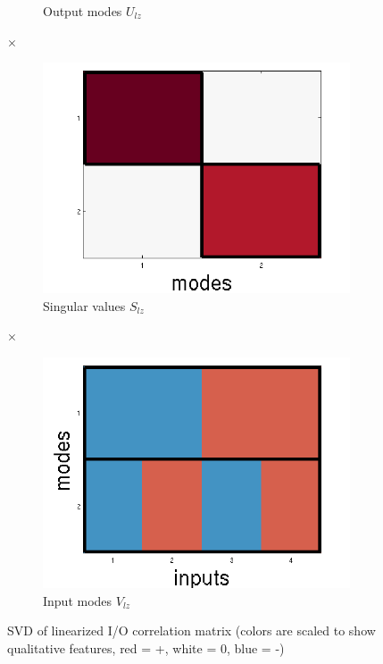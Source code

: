 \documentclass[10pt,letterpaper]{article}
\begin{document}
\begin{figure}
\begin{subfigure}{0.22\textwidth}
\caption{Output modes $U_{lz}$}
\end{subfigure}
\LARGE{$\times$}
\begin{subfigure}{0.22\textwidth}
\includegraphics[width=\textwidth]{figures/S_lz.png}
\caption{Singular values $S_{lz}$}
\end{subfigure}
\LARGE{$\times$}
\begin{subfigure}{0.22\textwidth}
\includegraphics[width=\textwidth]{figures/V_lz.png}
\caption{Input modes $V_{lz}$}
\end{subfigure}
\caption{SVD of linearized I/O correlation matrix (colors are scaled to show qualitative features, red = +, white = 0, blue = -)}
\label{linearized_SVD_figure}
\end{figure}
\end{document}
